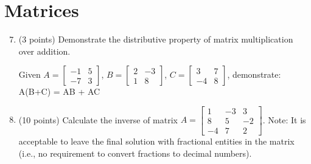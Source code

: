 \documentclass{article}%
\begin{document}
\section*{Matrices}
\begin{enumerate}
  \setcounter{enumi}{6}
    \item (3 points) Demonstrate the distributive property of matrix multiplication over addition. 
    
    Given $A = \begin{bmatrix}  -1 & 5 \\ -7 & 3\end{bmatrix}$, $B = \begin{bmatrix}  2 & -3 \\ 1 & 8\end{bmatrix}$, $C = \begin{bmatrix}  3 & 7 \\ -4 & 8\end{bmatrix}$, demonstrate: A(B+C) = AB + AC \vspace{2ex} 



   \item (10 points) Calculate the inverse of matrix $A =  \begin{bmatrix}  1 & -3 & 3 \\ 8 & 5 & -2 \\ -4 & 7 & 2\end{bmatrix}$. Note: It is acceptable to leave the final solution with fractional entities in the matrix (i.e., no requirement to convert fractions to decimal numbers).\vspace{2ex}

   
\end{enumerate}
\end{document}
